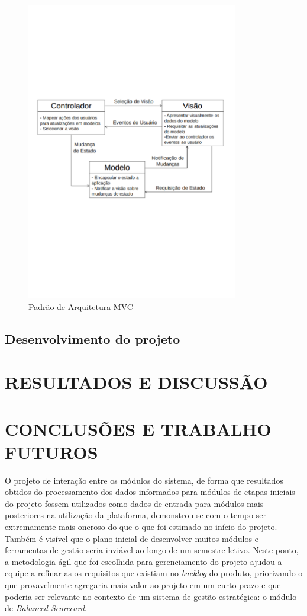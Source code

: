 \documentclass{abnt}
\begin{document}
\begin{figure}[!htb]
	\centering
	\includegraphics[width=350px]{mvc.pdf}
	\caption{Padrão de Arquitetura MVC}
	\label{MVCC}
\end{figure}

\section{Desenvolvimento do projeto}


\chapter{RESULTADOS E DISCUSSÃO}


\chapter{CONCLUSÕES E TRABALHO FUTUROS}

O projeto de interação entre os módulos do sistema, de forma que resultados
obtidos do processamento dos dados informados para módulos de etapas iniciais do
projeto fossem utilizados como dados de entrada para módulos mais
posteriores na utilização da plataforma, demonstrou-se com o tempo ser
extremamente mais oneroso do que o que foi estimado no início do projeto. Também
é visível que o plano inicial de desenvolver muitos módulos e ferramentas de
gestão seria inviável ao longo de um semestre letivo. Neste ponto, a metodologia
ágil que foi escolhida para gerenciamento do projeto ajudou a equipe a refinar
as os requisitos que existiam no \textit{backlog} do produto, priorizando o que
provavelmente agregaria mais valor ao projeto em um curto prazo e que poderia
ser relevante no contexto de um sistema de gestão estratégica: o módulo de
\textit{Balanced Scorecard}.
\end{document}
